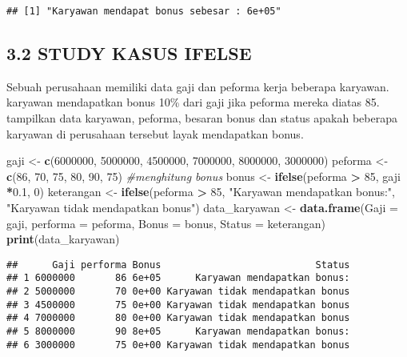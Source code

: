 \documentclass[
]{article}
\newenvironment{Shaded}{\begin{snugshade}}{\end{snugshade}}
\newcommand{\AttributeTok}[1]{\textcolor[rgb]{0.13,0.29,0.53}{#1}}
\newcommand{\CommentTok}[1]{\textcolor[rgb]{0.56,0.35,0.01}{\textit{#1}}}
\newcommand{\DecValTok}[1]{\textcolor[rgb]{0.00,0.00,0.81}{#1}}
\newcommand{\FloatTok}[1]{\textcolor[rgb]{0.00,0.00,0.81}{#1}}
\newcommand{\FunctionTok}[1]{\textcolor[rgb]{0.13,0.29,0.53}{\textbf{#1}}}
\newcommand{\NormalTok}[1]{#1}
\newcommand{\OtherTok}[1]{\textcolor[rgb]{0.56,0.35,0.01}{#1}}
\newcommand{\SpecialCharTok}[1]{\textcolor[rgb]{0.81,0.36,0.00}{\textbf{#1}}}
\newcommand{\StringTok}[1]{\textcolor[rgb]{0.31,0.60,0.02}{#1}}
\begin{document}
\begin{verbatim}
## [1] "Karyawan mendapat bonus sebesar : 6e+05"
\end{verbatim}

\subsection{3.2 STUDY KASUS IFELSE}\label{study-kasus-ifelse}

Sebuah perusahaan memiliki data gaji dan peforma kerja beberapa
karyawan. karyawan mendapatkan bonus 10\% dari gaji jika peforma mereka
diatas 85. tampilkan data karyawan, peforma, besaran bonus dan status
apakah beberapa karyawan di perusahaan tersebut layak mendapatkan bonus.

\begin{Shaded}
\begin{Highlighting}[]
\NormalTok{gaji }\OtherTok{\textless{}{-}} \FunctionTok{c}\NormalTok{(}\DecValTok{6000000}\NormalTok{, }\DecValTok{5000000}\NormalTok{, }\DecValTok{4500000}\NormalTok{, }\DecValTok{7000000}\NormalTok{, }\DecValTok{8000000}\NormalTok{, }\DecValTok{3000000}\NormalTok{)}
\NormalTok{peforma }\OtherTok{\textless{}{-}} \FunctionTok{c}\NormalTok{(}\DecValTok{86}\NormalTok{, }\DecValTok{70}\NormalTok{, }\DecValTok{75}\NormalTok{, }\DecValTok{80}\NormalTok{, }\DecValTok{90}\NormalTok{, }\DecValTok{75}\NormalTok{)}
\CommentTok{\#menghitung bonus }
\NormalTok{bonus }\OtherTok{\textless{}{-}} \FunctionTok{ifelse}\NormalTok{(peforma }\SpecialCharTok{\textgreater{}} \DecValTok{85}\NormalTok{, gaji }\SpecialCharTok{*}\FloatTok{0.1}\NormalTok{, }\DecValTok{0}\NormalTok{)}
\NormalTok{keterangan }\OtherTok{\textless{}{-}} \FunctionTok{ifelse}\NormalTok{(peforma }\SpecialCharTok{\textgreater{}} \DecValTok{85}\NormalTok{, }\StringTok{"Karyawan mendapatkan bonus:"}\NormalTok{, }\StringTok{"Karyawan tidak mendapatkan bonus"}\NormalTok{)}
\NormalTok{data\_karyawan }\OtherTok{\textless{}{-}} \FunctionTok{data.frame}\NormalTok{(}\AttributeTok{Gaji =}\NormalTok{ gaji, }\AttributeTok{performa =}\NormalTok{ peforma, }\AttributeTok{Bonus =}\NormalTok{ bonus, }\AttributeTok{Status =}\NormalTok{ keterangan)}
\FunctionTok{print}\NormalTok{(data\_karyawan)}
\end{Highlighting}
\end{Shaded}

\begin{verbatim}
##      Gaji performa Bonus                           Status
## 1 6000000       86 6e+05      Karyawan mendapatkan bonus:
## 2 5000000       70 0e+00 Karyawan tidak mendapatkan bonus
## 3 4500000       75 0e+00 Karyawan tidak mendapatkan bonus
## 4 7000000       80 0e+00 Karyawan tidak mendapatkan bonus
## 5 8000000       90 8e+05      Karyawan mendapatkan bonus:
## 6 3000000       75 0e+00 Karyawan tidak mendapatkan bonus
\end{verbatim}
\end{document}
